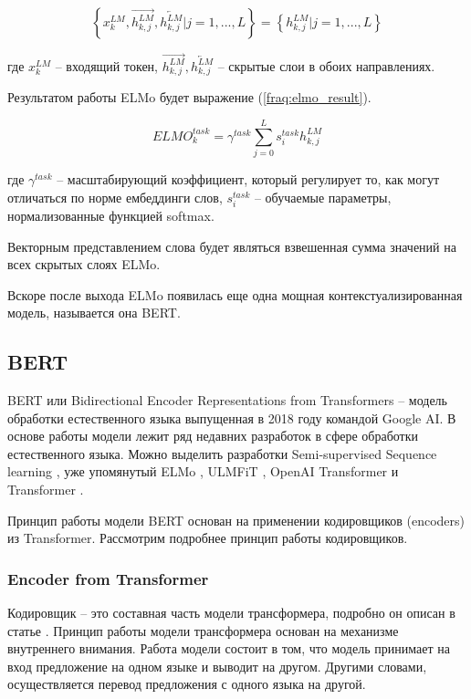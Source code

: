 \documentclass[a4paper,14pt]{article}
\begin{document}
\begin{equation}
	\left\{ x_k^{LM}, \overrightarrow{h_{k,j}^{LM}}, \overleftarrow{h_{k,j}^{LM}}  |j = 1, ...,L\right\} = 
	\left\{h_{k,j}^{LM}|j = 1, ...,L
	\right\}
	\label{fraq:array_elmo}
\end{equation}

где $x_k^{LM}$ -- входящий токен, $\overrightarrow{h_{k,j}^{LM}}, \overleftarrow{h_{k,j}^{LM}}$ -- скрытые слои в обоих направлениях.

Результатом работы ELMo будет выражение (\ref{fraq:elmo_result}).

\begin{equation}
	ELMO_k^{task} = \gamma^{task}\sum_{j=0}^{L} s_{i}^{task}h_{k,j}^{LM}
	\label{fraq:elmo_result}
\end{equation}

где $\gamma^{task}$ -- масштабирующий коэффициент, который регулирует то, как могут отличаться по норме ембеддинги слов, $s_{i}^{task}$ -- обучаемые параметры, нормализованные функцией softmax.

Векторным представлением слова будет являться взвешенная сумма значений на всех скрытых слоях ELMo.

Вскоре после выхода ELMo появилась еще одна мощная контекстуализированная модель, называется она BERT.

\subsection{BERT}

BERT \cite{bert1} или Bidirectional Encoder Representations from Transformers -- модель обработки естественного языка выпущенная в 2018 году командой Google AI.
В основе работы модели лежит ряд недавних разработок в сфере обработки естественного языка.
Можно выделить разработки Semi-supervised Sequence learning \cite{semi}, уже упомянутый ELMo \cite{elmo1,elmo2,elmo3}, ULMFiT \cite{ulmfit}, OpenAI Transformer \cite{transformers} и Transformer \cite{attention}.

Принцип работы модели BERT основан на применении кодировщиков (encoders) из Transformer.
Рассмотрим подробнее принцип работы кодировщиков.

\subsubsection{Encoder from Transformer}

Кодировщик -- это составная часть модели трансформера, подробно он описан в статье \cite{attention}.
Принцип работы модели трансформера основан на механизме внутреннего внимания.
Работа модели состоит в том, что модель принимает на вход предложение на одном языке и выводит на другом.
Другими словами, осуществляется перевод предложения с одного языка на другой.
\end{document}
